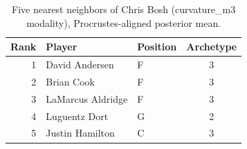 \begin{table}[htbp]
  \centering\small
  \begin{tabular}{rllc}
    \toprule
    Rank & Player & Position & Archetype \\
    \midrule
    1 & David Andersen & F & 3 \\
    2 & Brian Cook & F & 3 \\
    3 & LaMarcus Aldridge & F & 3 \\
    4 & Luguentz Dort & G & 2 \\
    5 & Justin Hamilton & C & 3 \\
    \bottomrule
  \end{tabular}
  \caption{Five nearest neighbors of Chris Bosh (curvature_m3 modality), Procrustes-aligned posterior mean.}
  \label{tab:Chris_Bosh_neighbors_curvature_m3}
\end{table}

